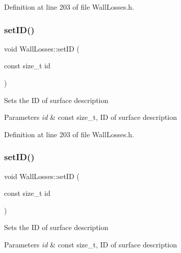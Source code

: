 Definition at line 203 of file Wall\+Losses.\+h.

\mbox{\label{class_wall_losses_a91526efc0eb1bf030ebc1d864a21acdd}} 
\subsubsection{\texorpdfstring{set\+I\+D()}{setID()}\hspace{0.1cm}{\footnotesize\ttfamily [2/3]}}
{\footnotesize\ttfamily void Wall\+Losses\+::set\+ID (\begin{DoxyParamCaption}\item[{const size\+\_\+t}]{id }\end{DoxyParamCaption})\hspace{0.3cm}{\ttfamily [inline]}}

Sets the ID of surface description 
\begin{DoxyParams}{Parameters}
{\em id} & const size\+\_\+t, ID of surface description \\
\hline
\end{DoxyParams}


Definition at line 203 of file Wall\+Losses.\+h.

\mbox{\label{class_wall_losses_a91526efc0eb1bf030ebc1d864a21acdd}} 
\subsubsection{\texorpdfstring{set\+I\+D()}{setID()}\hspace{0.1cm}{\footnotesize\ttfamily [3/3]}}
{\footnotesize\ttfamily void Wall\+Losses\+::set\+ID (\begin{DoxyParamCaption}\item[{const size\+\_\+t}]{id }\end{DoxyParamCaption})\hspace{0.3cm}{\ttfamily [inline]}}

Sets the ID of surface description 
\begin{DoxyParams}{Parameters}
{\em id} & const size\+\_\+t, ID of surface description \\
\hline
\end{DoxyParams}


